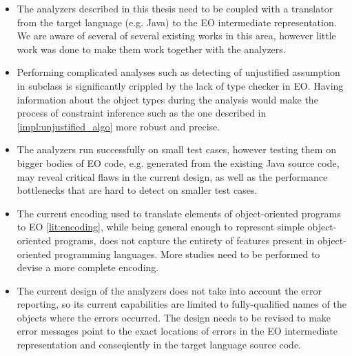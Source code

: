 \begin{itemize}
    \item The analyzers described in this thesis need to be coupled with a translator from the target language (e.g. Java) to the EO intermediate representation. We are aware of several of several existing works in this area, however little work was done to make them work together with the analyzers.
    \item Performing complicated analyses such as detecting of unjustified assumption in subclass is significantly crippled by the lack of type checker in EO. Having information about the object types during the analysis would make the process of constraint inference such as the one described in \ref{impl:unjustified_algo} more robust and precise. 
    \item The analyzers run successfully on small test cases, however testing them on bigger bodies of EO code, e.g. generated from the existing Java source code, may reveal critical flaws in the current design, as well as the performance bottlenecks that are hard to detect on smaller test cases. 
    \item The current encoding used to translate elements of object-oriented programs to EO \ref{lit:encoding}, while being general enough to represent simple object-oriented programs, does not capture the entirety of features present in object-oriented programming languages. More studies need to be performed to devise a more complete encoding. 
    \item The current design of the analyzers does not take into account the error reporting, so its current capabilities are limited to fully-qualified names of the objects where the errors occurred. The design needs to be revised to make error messages point to the exact locations of errors in the EO intermediate representation and conseqiently in the target language source code.
\end{itemize}


